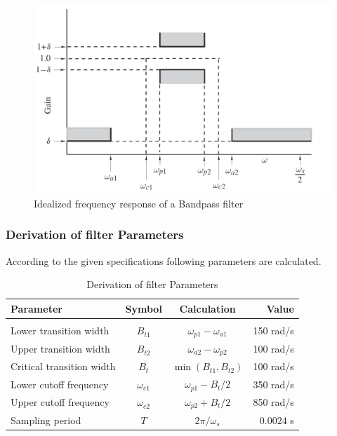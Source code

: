 \documentclass[a4paper,11pt]{article}%
\begin{document}
\begin{figure}[!h]
	\centering
	\includegraphics[scale=0.4]{figures/filtersepecs}
	\caption{Idealized frequency response of a Bandpass filter\cite{antonio}}
\end{figure}
\pagebreak
\subsubsection{Derivation of filter Parameters}

According to the given specifications following parameters are calculated.

\begin{table}[!h]
	\centering
	\caption{Derivation of filter Parameters}
\begin{tabular}{l c c r}
	\hline
\textbf{Parameter}& \textbf{Symbol}& \textbf{Calculation}&\textbf{Value}\\\hline
&&&\\
Lower transition width& $B_{t1}$& $\omega_{p1} - \omega_{a1}$&150 rad/s\\
Upper transition width& $B_{t2}$&$\omega_{a2}-\omega_{p2}$&100 rad/s\\
Critical transition width& $B_t$&$\min(B_{t1},B_{t2})$&100 rad/s\\
Lower cutoff frequency& $\omega_{c1}$&$\omega_{p1}-B_t/2$&350 rad/s\\
Upper cutoff frequency& $\omega_{c2}$&$\omega_{p2}+B_t/2 $&850 rad/s \\
Sampling period& $T$& $2\pi / \omega_s$&$0.0024$ s\\
\hline\hline
\end{tabular}

\end{table}
\end{document}
